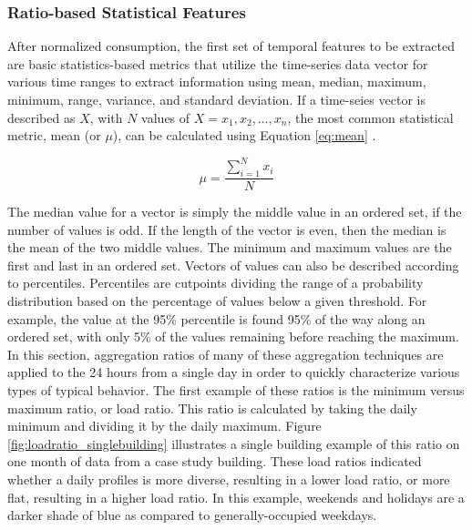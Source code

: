 \subsubsection{Ratio-based Statistical Features}
\label{sec:ratiobasedfeatures}

After normalized consumption, the first set of temporal features to be extracted are basic statistics-based metrics that utilize the time-series data vector for various time ranges to extract information using mean, median, maximum, minimum, range, variance, and standard deviation. If a time-seies vector is described as $X$, with $N$ values of $X = {x_1, x_2,...,x_n}$, the most common statistical metric, mean (or $\mu$), can be calculated using Equation \ref{eq:mean} \cite{Mitsa_2010}.

\begin{equation}
\mu = \frac{\sum\limits_{i=1}^N x_i}{N}
\label{eq:mean}
\end{equation}

The median value for a vector is simply the middle value in an ordered set, if the number of values is odd. If the length of the vector is even, then the median is the mean of the two middle values. The minimum and maximum values are the first and last in an ordered set. Vectors of values can also be described according to percentiles. Percentiles are cutpoints dividing the range of a probability distribution based on the percentage of values below a given threshold. For example, the value at the 95\% percentile is found 95\% of the way along an ordered set, with only 5\% of the values remaining before reaching the maximum. In this section, aggregation ratios of many of these aggregation techniques are applied to the 24 hours from a single day in order to quickly characterize various types of typical behavior. The first example of these ratios is the minimum versus maximum ratio, or load ratio. This ratio is calculated by taking the daily minimum and dividing it by the daily maximum. Figure \ref{fig:loadratio_singlebuilding} illustrates a single building example of this ratio on one month of data from a case study building. These load ratios indicated whether a daily profiles is more diverse, resulting in a lower load ratio, or more flat, resulting in a higher load ratio. In this example, weekends and holidays are a darker shade of blue as compared to generally-occupied weekdays.
